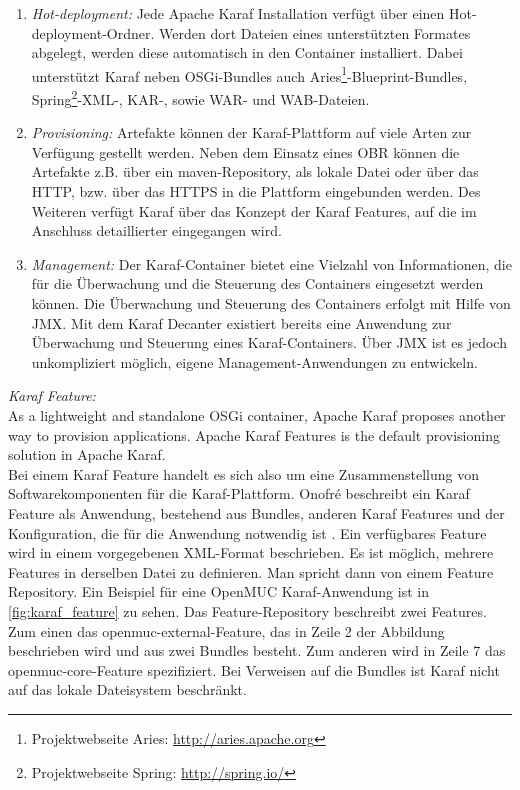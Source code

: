 \begin{enumerate}
 \item \textit{Hot-deployment:} Jede Apache Karaf Installation verfügt über einen Hot-deploy\-ment-Ordner. 
 Werden dort Dateien eines unterstützten Formates abgelegt, werden diese automatisch in den Container installiert.
 Dabei unterstützt Karaf neben \ac{OSGi}-Bundles auch Aries\footnote{Projektwebseite Aries: \url{http://aries.apache.org}}-Blueprint-Bundles, 
 Spring\footnote{Projektwebseite Spring: \url{http://spring.io/}}-\ac{XML}-, \ac{KAR}-, sowie \ac{WAR}- und \ac{WAB}-Dateien.
 
 \item \textit{Provisioning:} Artefakte können der Karaf-Plattform auf viele Arten zur Verfügung gestellt werden. Neben dem Einsatz eines \ac{OBR} können
 die Artefakte z.B. über ein maven-Repository, als lokale Datei oder über das \ac{HTTP}, bzw. über das \ac{HTTPS} in die Plattform eingebunden werden. 
 Des Weiteren verfügt Karaf über das Konzept der Karaf Features, auf die im Anschluss detaillierter eingegangen wird.
 
 \item \textit{Management:} Der Karaf-Container bietet eine Vielzahl von Informationen, die für die Überwachung und die Steuerung des Containers eingesetzt
 werden können. Die Überwachung und Steuerung des Containers erfolgt mit Hilfe von \ac{JMX}. Mit dem Karaf Decanter existiert bereits eine 
 Anwendung zur Überwachung und Steuerung eines Karaf-Containers. Über \ac{JMX} ist es jedoch unkompliziert möglich, eigene Management-Anwendungen zu entwickeln.
\end{enumerate}

\textit{Karaf Feature:}\\
\glqq As a lightweight and standalone \ac{OSGi} container, Apache Karaf proposes another way to provision applications.
Apache Karaf Features is the default provisioning solution in Apache Karaf. \grqq\ \cite{learning_karaf_cellar}\\

Bei einem Karaf Feature handelt es sich also um eine Zusammenstellung von Softwarekomponenten für die Karaf-Plattform.
Onofré beschreibt ein Karaf Feature als Anwendung, bestehend aus Bundles, anderen Karaf Features und der Konfiguration, 
die für die Anwendung notwendig ist \cite{learning_karaf_cellar}.
Ein verfügbares Feature wird in einem vorgegebenen \ac{XML}-Format beschrieben. Es ist möglich, mehrere Features in derselben Datei zu
definieren. Man spricht dann von einem Feature Repository. Ein Beispiel für eine OpenMUC Karaf-Anwendung ist in 
\autoref{fig:karaf_feature} zu sehen. Das Feature-Repository beschreibt zwei Features.
Zum einen das openmuc-external-Feature, das in Zeile 2 der Abbildung beschrieben wird und aus zwei Bundles besteht.
Zum anderen wird in Zeile 7 das openmuc-core-Feature spezifiziert.
Bei Verweisen auf die Bundles ist Karaf nicht auf das lokale Dateisystem beschränkt.

